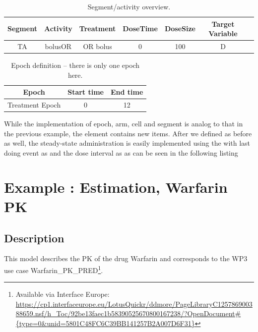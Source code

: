 \begin{table}[htdp!]
\begin{center}
\begin{tabular}{ccccccc}
\hline
Segment&Activity & Treatment & DoseTime & DoseSize & Target Variable \\
\hline
TA& bolusOR &  OR bolus & 0 & 100 & D \\
\hline
\end{tabular}
\end{center}
\caption{Segment/activity overview.}
\label{tab:segementActivity_Ribba}
\end{table}

\begin{table}[htdp!]
\begin{center}
\begin{tabular}{ccc}
\hline
Epoch & Start time & End time \\
\hline
Treatment Epoch & 0 &  12  \\
\hline
\end{tabular}
\end{center}
\caption{Epoch definition -- there is only one epoch here.}
\label{fig:Bonate:epochDef}
\end{table}

While the implementation of epoch, arm, cell and segment is analog to that in the 
previous example, the  element contains new items. After we 
defined  as before as well, the steady-state administration 
is easily implemented using the  with last doing event as
 and the dose interval as  as can be seen 
in the following listing 



\section{Example \theexamples: Estimation, Warfarin PK}
\label{sec:eg4}

\subsection{Description}

This model describes the PK of the drug Warfarin and corresponds to
the \ddmore WP3 use case Warfarin\_PK\_PRED\footnote{\raggedright Available via Interface Europe: \url{https://cp1.interfaceurope.eu/LotusQuickr/ddmore/PageLibraryC125786900388659.nsf/h_Toc/92be13faec1b58390525670800167238/?OpenDocument\#{type=0\&unid=5801C48FC6C39BB141257B2A007D6F31}}}. 

